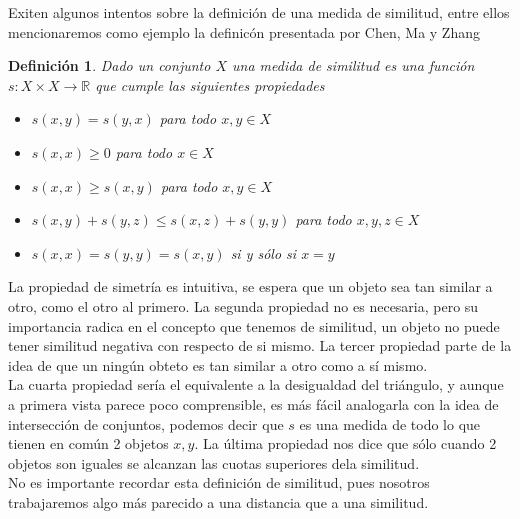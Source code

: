 \documentclass[12pt,oneside]{book}
\newtheorem*{defn}{Definici\'on}
\newcommand{\Reales}{{\mathbb{R}}}
\begin{document}
Exiten algunos intentos sobre la definici\'on de una medida de similitud, entre ellos mencionaremos como ejemplo la definic\'on presentada por Chen, Ma y Zhang ~\cite{CLUSTER_ANALYSIS_2}

\begin{defn}\normalfont
	Dado un conjunto $X$ una medida de similitud es una funci\'on $s:X\times X\rightarrow\Reales$ que cumple las siguientes propiedades
	\begin{itemize}
		\item $s(x, y) = s(y, x)$ para todo $x, y\in X$
		\item $s(x, x) \geq 0$ para todo $x\in X$
		\item $s(x, x) \geq s(x, y)$ para todo $x, y\in X$
		\item $s(x, y) + s(y, z) \leq s(x, z) + s(y, y)$ para todo $x, y, z \in X$
		\item $s(x, x) = s(y,y) = s(x, y)$ si y s\'olo si $x=y$
	\end{itemize}
\end{defn}

La propiedad de simetr\'ia es intuitiva, se espera que un objeto sea tan similar a otro, como el otro al primero. La segunda propiedad no es necesaria, pero su importancia radica en el concepto que tenemos de similitud, un objeto no puede tener similitud negativa con respecto de si mismo. La tercer propiedad parte de la idea de que un ning\'un obteto es tan similar a otro como a s\'i mismo. \\

La cuarta propiedad ser\'ia el equivalente a la desigualdad del tri\'angulo, y aunque a primera vista parece poco comprensible, es m\'as f\'acil analogarla con la idea de intersecci\'on de conjuntos, podemos decir que $s$ es una medida de todo lo que tienen en com\'un 2 objetos $x, y$. La \'ultima propiedad nos dice que s\'olo cuando 2 objetos son iguales se alcanzan las cuotas superiores dela similitud.\\

No es importante recordar esta definici\'on de similitud, pues nosotros trabajaremos algo m\'as parecido a una distancia que a una similitud.\\
\end{document}
